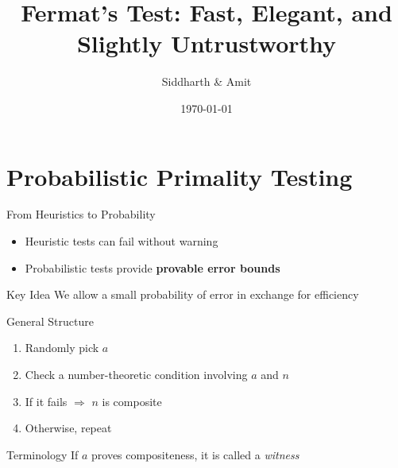 \documentclass{beamer}
\title{Fermat's Test: Fast, Elegant, and Slightly Untrustworthy}
\author{Siddharth \& Amit}
\date{\today}
\newcommand{\bld}[1]{\textbf{#1}}
\newcommand{\itl}[1]{\textit{#1}}
\begin{document}
\maketitle
\section{Probabilistic Primality Testing}

\begin{frame}{From Heuristics to Probability}

\begin{itemize}
    \item Heuristic tests can fail without warning
    \item Probabilistic tests provide \bld{provable error bounds}
\end{itemize}

\vspace{1em}

\begin{block}{Key Idea}
We allow a small probability of error in exchange for efficiency
\end{block}

\end{frame}


\begin{frame}{General Structure}

\begin{enumerate}
    \item Randomly pick $a$
    \item Check a number-theoretic condition involving $a$ and $n$
    \item If it fails $\Rightarrow$ $n$ is composite
    \item Otherwise, repeat
\end{enumerate}

\vspace{1em}

\begin{block}{Terminology}
If $a$ proves compositeness, it is called a \itl{witness}
\end{block}

\end{frame}

\end{document}
